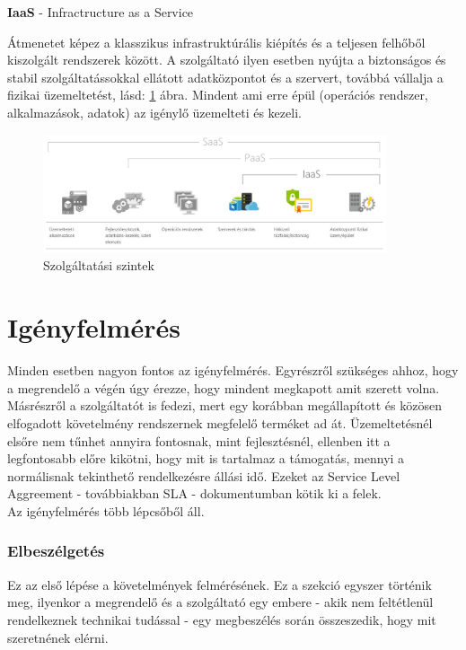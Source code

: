 \documentclass[12pt,oneside,justify,table]{book}
\begin{document}
\noindent \textbf{IaaS} - Infractructure as a Service \cite{IaaS}

Átmenetet képez a klasszikus infrastruktúrális kiépítés és a teljesen felhőből kiszolgált rendszerek között. A szolgáltató ilyen esetben nyújta a biztonságos és stabil szolgáltatássokkal ellátott adatközpontot és a szervert, továbbá vállalja a fizikai üzemeltetést, lásd: \ref{fig:aaS} ábra. Mindent ami erre épül (operációs rendszer, alkalmazások, adatok) az igénylő üzemelteti és kezeli. 
\begin{figure}[h]
\centering
\includegraphics[width=0.9\textwidth]{aaS.jpg}
\caption{Szolgáltatási szintek}
\label{fig:aaS}
\end{figure}

\section{Igényfelmérés}
Minden esetben nagyon fontos az igényfelmérés. Egyrészről szükséges ahhoz, hogy a megrendelő a végén úgy érezze, hogy mindent megkapott amit szerett volna. Másrészről a szolgáltatót is fedezi, mert egy korábban megállapított és közösen elfogadott követelmény rendszernek megfelelő terméket ad át. Üzemeltetésnél elsőre nem tűnhet annyira fontosnak, mint fejlesztésnél, ellenben itt a legfontosabb előre kikötni, hogy mit is tartalmaz a támogatás, mennyi a normálisnak tekinthető rendelkezésre állási idő. Ezeket az Service Level Aggreement - továbbiakban SLA - dokumentumban kötik ki a felek. \\
Az igényfelmérés több lépcsőből áll. 
\subsubsection{Elbeszélgetés}
Ez az első lépése a követelmények felmérésének. Ez a szekció egyszer történik meg, ilyenkor a megrendelő és a szolgáltató egy embere - akik nem feltétlenül rendelkeznek technikai tudással - egy megbeszélés során összeszedik, hogy mit szeretnének elérni. 
\end{document}
